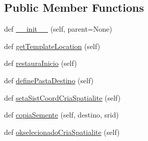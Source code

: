 \subsection*{Public Member Functions}
\begin{DoxyCompactItemize}
\item 
def \mbox{\hyperlink{class_dsg_tools_1_1_db_tools_1_1_spatialite_tool_1_1cria__spatialite__dialog_1_1_cria_spatialite_dialog_a2e5817ff54940e688dcfdbb9f6cf2ab3}{\+\_\+\+\_\+init\+\_\+\+\_\+}} (self, parent=None)
\item 
def \mbox{\hyperlink{class_dsg_tools_1_1_db_tools_1_1_spatialite_tool_1_1cria__spatialite__dialog_1_1_cria_spatialite_dialog_adf4ef090aa718ccbca1beb30803b3a34}{get\+Template\+Location}} (self)
\item 
def \mbox{\hyperlink{class_dsg_tools_1_1_db_tools_1_1_spatialite_tool_1_1cria__spatialite__dialog_1_1_cria_spatialite_dialog_a302a63967b368e32910dbfa56f6e583a}{restaura\+Inicio}} (self)
\item 
def \mbox{\hyperlink{class_dsg_tools_1_1_db_tools_1_1_spatialite_tool_1_1cria__spatialite__dialog_1_1_cria_spatialite_dialog_a4fc8123823f6c35abac0e0270b4f6be6}{define\+Pasta\+Destino}} (self)
\item 
def \mbox{\hyperlink{class_dsg_tools_1_1_db_tools_1_1_spatialite_tool_1_1cria__spatialite__dialog_1_1_cria_spatialite_dialog_a8d3587ec231d47e613e7187dfa5b4ab6}{seta\+Sist\+Coord\+Cria\+Spatialite}} (self)
\item 
def \mbox{\hyperlink{class_dsg_tools_1_1_db_tools_1_1_spatialite_tool_1_1cria__spatialite__dialog_1_1_cria_spatialite_dialog_a3fc898d1ffb8026e1efb72b209e6b4f7}{copia\+Semente}} (self, destino, srid)
\item 
def \mbox{\hyperlink{class_dsg_tools_1_1_db_tools_1_1_spatialite_tool_1_1cria__spatialite__dialog_1_1_cria_spatialite_dialog_ab4f2578b26570dea3b1c388792a233d8}{okselecionado\+Cria\+Spatialite}} (self)
\end{DoxyCompactItemize}
